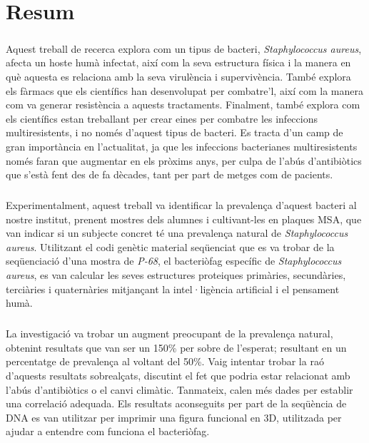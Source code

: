\documentclass[fontsize=12pt,twoside=semi,openright,numbers=noenddot,parskip=half]{scrbook}
\begin{document}
\chapter*{Resum}
\paragraph{}Aquest treball de recerca explora com un tipus de bacteri, \emph{Staphylococcus aureus}, afecta un hoste humà infectat, així com la seva estructura física i la manera en què aquesta es relaciona amb la seva virulència i supervivència. També explora els fàrmacs que els científics han desenvolupat per combatre'l, així com la manera com va generar resistència a aquests tractaments. Finalment, també explora com els científics estan treballant per crear eines per combatre les infeccions multiresistents, i no només d'aquest tipus de bacteri. Es tracta d'un camp de gran importància en l'actualitat, ja que les infeccions bacterianes multiresistents només faran que augmentar en els pròxims anys, per culpa de l'abús d'antibiòtics que s'està fent des de fa dècades, tant per part de metges com de pacients.
\paragraph{}Experimentalment, aquest treball va identificar la prevalença d'aquest bacteri al nostre institut, prenent mostres dels alumnes i cultivant-les en plaques MSA, que van indicar si un subjecte concret té una prevalença natural de \emph{Staphylococcus aureus}. Utilitzant el codi genètic material seqüenciat que es va trobar de la seqüenciació d'una mostra de  \emph{P-68}, el bacteriòfag específic de \emph{Staphylococcus aureus}, es van calcular les seves estructures proteiques primàries, secundàries, terciàries i quaternàries mitjançant la intel·ligència artificial i el pensament humà.
\paragraph{}La investigació va trobar un augment preocupant de la prevalença natural, obtenint resultats que van ser un 150\% per sobre de l'esperat; resultant en un percentatge de prevalença al voltant del 50\%. Vaig intentar trobar la raó d'aquests resultats sobrealçats, discutint el fet que podria estar relacionat amb l'abús d'antibiòtics o el canvi climàtic. Tanmateix, calen més dades per establir una correlació adequada. Els resultats aconseguits per part de la seqüència de DNA es van utilitzar per imprimir una figura funcional en 3D, utilitzada per ajudar a entendre com funciona el bacteriòfag.
\end{document}

